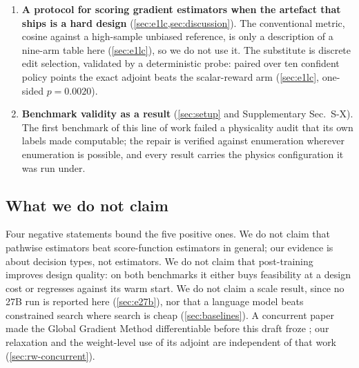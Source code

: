 \begin{enumerate}
\item \textbf{A protocol for scoring gradient estimators when the artefact
  that ships is a hard design} (\cref{sec:e1lc,sec:discussion}).  The
  conventional metric, cosine against a high-sample unbiased reference, is only
  a description of a nine-arm table here (\cref{sec:e1lc}), so we do not use it.
  The substitute is discrete edit selection, validated by a deterministic probe:
  paired over ten confident policy points the exact adjoint beats the
  scalar-reward arm (\cref{sec:e1lc}, one-sided $p=0.0020$).

\item \textbf{Benchmark validity as a result} (\cref{sec:setup} and
  Supplementary Sec.~S-X).  The first benchmark of this line of work failed a
  physicality audit that its own labels made computable; the repair is verified
  against enumeration wherever enumeration is possible, and every result carries
  the physics configuration it was run under.

\end{enumerate}

\subsection{What we do not claim}
\label{sec:notclaim}

Four negative statements bound the five positive ones.  We do not claim that
pathwise estimators beat score-function estimators in general; our evidence is
about decision types, not estimators.  We do not claim that post-training
improves design quality: on both benchmarks it either buys feasibility at a
design cost or regresses against its warm start.  We do not claim a scale
result, since no 27B run is reported here
(\cref{sec:e27b}), nor that a language model beats constrained search where
search is cheap (\cref{sec:baselines}).  A concurrent paper made the Global
Gradient Method differentiable before this draft froze \cite{mu2026gga}; our
relaxation and the weight-level use of its adjoint are independent of that work
(\cref{sec:rw-concurrent}).
